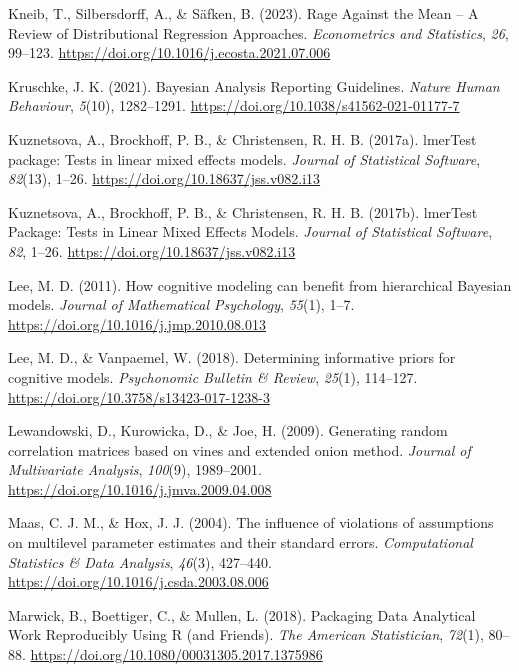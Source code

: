\documentclass[
  doc,12pt,floatsintext]{apa7}
\newlength{\cslhangindent}
\newenvironment{CSLReferences}[2] %
 {\begin{list}{}{%
  \setlength{\itemindent}{0pt}
  \setlength{\leftmargin}{0pt}
  \setlength{\parsep}{0pt}
  \ifodd #1
   \setlength{\leftmargin}{\cslhangindent}
   \setlength{\itemindent}{-1\cslhangindent}
  \fi
  \setlength{\itemsep}{#2\baselineskip}}}
 {\end{list}}
\begin{document}
\begin{CSLReferences}{1}{0}
Kneib, T., Silbersdorff, A., \& Säfken, B. (2023). Rage {Against} the {Mean} -- {A Review} of {Distributional Regression Approaches}. \emph{Econometrics and Statistics}, \emph{26}, 99--123. \url{https://doi.org/10.1016/j.ecosta.2021.07.006}

Kruschke, J. K. (2021). Bayesian {Analysis Reporting Guidelines}. \emph{Nature Human Behaviour}, \emph{5}(10), 1282--1291. \url{https://doi.org/10.1038/s41562-021-01177-7}

Kuznetsova, A., Brockhoff, P. B., \& Christensen, R. H. B. (2017a). {lmerTest} package: Tests in linear mixed effects models. \emph{Journal of Statistical Software}, \emph{82}(13), 1--26. \url{https://doi.org/10.18637/jss.v082.i13}

Kuznetsova, A., Brockhoff, P. B., \& Christensen, R. H. B. (2017b). {lmerTest Package}: {Tests} in {Linear Mixed Effects Models}. \emph{Journal of Statistical Software}, \emph{82}, 1--26. \url{https://doi.org/10.18637/jss.v082.i13}

Lee, M. D. (2011). How cognitive modeling can benefit from hierarchical {Bayesian} models. \emph{Journal of Mathematical Psychology}, \emph{55}(1), 1--7. \url{https://doi.org/10.1016/j.jmp.2010.08.013}

Lee, M. D., \& Vanpaemel, W. (2018). Determining informative priors for cognitive models. \emph{Psychonomic Bulletin \& Review}, \emph{25}(1), 114--127. \url{https://doi.org/10.3758/s13423-017-1238-3}

Lewandowski, D., Kurowicka, D., \& Joe, H. (2009). Generating random correlation matrices based on vines and extended onion method. \emph{Journal of Multivariate Analysis}, \emph{100}(9), 1989--2001. \url{https://doi.org/10.1016/j.jmva.2009.04.008}

Maas, C. J. M., \& Hox, J. J. (2004). The influence of violations of assumptions on multilevel parameter estimates and their standard errors. \emph{Computational Statistics \& Data Analysis}, \emph{46}(3), 427--440. \url{https://doi.org/10.1016/j.csda.2003.08.006}

Marwick, B., Boettiger, C., \& Mullen, L. (2018). Packaging {Data Analytical Work Reproducibly Using R} (and {Friends}). \emph{The American Statistician}, \emph{72}(1), 80--88. \url{https://doi.org/10.1080/00031305.2017.1375986}


\end{CSLReferences}
\end{document}
